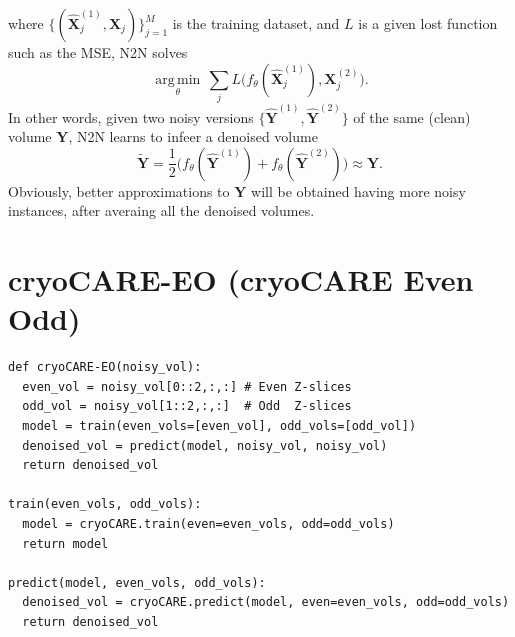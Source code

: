 where $\{(\hat{\mathbf X}_j^{(1)}, {\mathbf X}_j)\}_{j=1}^M$ is the training
dataset, and $L$ is a given lost function such as the MSE, N2N solves
\begin{equation}
  \underset{\theta}{\operatorname{arg\,min}} \, \sum_j L \big(f_\theta(\hat{\mathbf X}_j^{(1)}), {\mathbf X}_j^{(2)}\big).
\end{equation}
In other words, given two noisy versions
$\{\hat{\mathbf Y}^{(1)}, \hat{\mathbf Y}^{(2)}\}$ of the same (clean)
volume ${\mathbf Y}$, N2N learns to infeer a denoised volume
\begin{equation}
  \tilde{\mathbf Y}=\frac{1}{2}\big(f_\theta(\hat{\mathbf Y}^{(1)})+f_\theta(\hat{\mathbf Y}^{(2)})\big)\approx{\mathbf Y}.
\end{equation}
Obviously, better approximations to ${\mathbf Y}$ will be obtained
having more noisy instances, after averaing all the denoised volumes.


\section{cryoCARE-EO (cryoCARE Even Odd)}

\begin{verbatim}
def cryoCARE-EO(noisy_vol):
  even_vol = noisy_vol[0::2,:,:] # Even Z-slices
  odd_vol = noisy_vol[1::2,:,:]  # Odd  Z-slices
  model = train(even_vols=[even_vol], odd_vols=[odd_vol])
  denoised_vol = predict(model, noisy_vol, noisy_vol)
  return denoised_vol

train(even_vols, odd_vols):
  model = cryoCARE.train(even=even_vols, odd=odd_vols)
  return model

predict(model, even_vols, odd_vols):
  denoised_vol = cryoCARE.predict(model, even=even_vols, odd=odd_vols)
  return denoised_vol
\end{verbatim}

